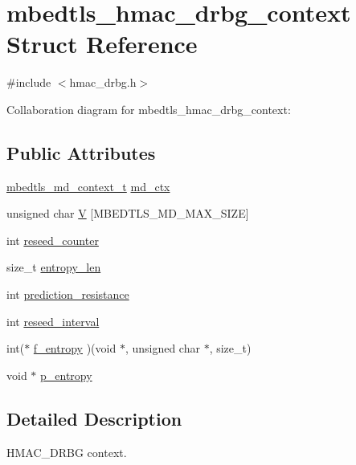 \hypertarget{structmbedtls__hmac__drbg__context}{}\section{mbedtls\+\_\+hmac\+\_\+drbg\+\_\+context Struct Reference}
\label{structmbedtls__hmac__drbg__context}


{\ttfamily \#include $<$hmac\+\_\+drbg.\+h$>$}



Collaboration diagram for mbedtls\+\_\+hmac\+\_\+drbg\+\_\+context\+:
\subsection*{Public Attributes}
\begin{DoxyCompactItemize}
\item 
\mbox{\hyperlink{structmbedtls__md__context__t}{mbedtls\+\_\+md\+\_\+context\+\_\+t}} \mbox{\hyperlink{structmbedtls__hmac__drbg__context_ae5ab42fe02b5f9d26c5b4535e3614a4d}{md\+\_\+ctx}}
\item 
unsigned char \mbox{\hyperlink{structmbedtls__hmac__drbg__context_a3e426c343012174c037a462535d23715}{V}} \mbox{[}M\+B\+E\+D\+T\+L\+S\+\_\+\+M\+D\+\_\+\+M\+A\+X\+\_\+\+S\+I\+ZE\mbox{]}
\item 
int \mbox{\hyperlink{structmbedtls__hmac__drbg__context_a3bdabbbda4d50c954907f5db1f8cecaf}{reseed\+\_\+counter}}
\item 
size\+\_\+t \mbox{\hyperlink{structmbedtls__hmac__drbg__context_a137d68a6581248a2a6fbe06dae4a830b}{entropy\+\_\+len}}
\item 
int \mbox{\hyperlink{structmbedtls__hmac__drbg__context_a2c486e648011f32883056541249f7a80}{prediction\+\_\+resistance}}
\item 
int \mbox{\hyperlink{structmbedtls__hmac__drbg__context_aa69d31aabb0c213dd5f3ea38b8f3f1ad}{reseed\+\_\+interval}}
\item 
int($\ast$ \mbox{\hyperlink{structmbedtls__hmac__drbg__context_aab9615a6dcd72775be46bca4197df058}{f\+\_\+entropy}} )(void $\ast$, unsigned char $\ast$, size\+\_\+t)
\item 
void $\ast$ \mbox{\hyperlink{structmbedtls__hmac__drbg__context_a218d146b662c9795b9f05b94fa482790}{p\+\_\+entropy}}
\end{DoxyCompactItemize}


\subsection{Detailed Description}
H\+M\+A\+C\+\_\+\+D\+R\+BG context. 

